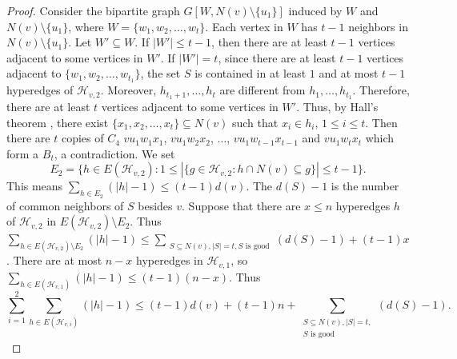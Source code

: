 \documentclass[11pt,a4paper]{article}
\theoremstyle{definition}
\newenvironment{claimproof}
  {\renewcommand{\qedsymbol}{\ensuremath{\blacksquare}}\proof}
  {\endproof}
  {\endproof}
\begin{document}
\begin{proof}
\begin{claimproof}
                Consider the bipartite graph $G[W, N(v) \setminus \{u_1\}]$ induced by $W$ and $N(v) \setminus \{u_1\}$, where $W = \{w_1, w_2, \dots, w_t\}$.
                Each vertex in $W$ has $t - 1$ neighbors in $N(v) \setminus \{u_1\}$.
                Let $W' \subseteq W$.
                If $|W'| \leq t-1$, then there are at least $t-1$ vertices adjacent to some vertices in $W'$.
                If $|W'| = t$, since there are at least $t-1$ vertices adjacent to $\{w_1, w_2, \dots, w_{t_1}\}$, the set $S$ is contained in at least $1$ and at most $t-1$ hyperedges of $\mathcal{H}_{v, 2}$.
                Moreover, $h_{t_1+1}, \dots, h_t$ are different from $h_1, \dots, h_{t_1}$. 
                Therefore, there are at least $t$ vertices adjacent to some vertices in $W'$.
                Thus, by Hall's theorem \cite{HallOn1935}, there exist $\{x_1, x_2, \dots, x_t\} \subseteq N(v)$ such that $x_i \in h_i$, $1 \leq i \leq t$.
                Then there are $t$ copies of $C_4$ $v u_1 w_1 x_1$, $v u_1 w_2 x_2$, $\dots$, $v u_1 w_{t-1} x_{t-1}$ and $v u_1 w_t x_t$ which form a $B_t$, a contradiction.
            \end{claimproof}
            \noindent We set 
            $$E_2 = \{h \in E(\mathcal{H}_{v, 2}): 1 \leq |\{g \in \mathcal{H}_{v, 2}: h \cap N(v) \subseteq g\}| \leq t-1\}.$$
            This means $\sum_{h \in E_2} (|h| - 1) \leq (t-1)d(v).$
            The $d(S) - 1$ is the number of common neighbors of $S$ besides $v$.
            Suppose that there are $x \leq n$ hyperedges $h$ of $\mathcal{H}_{v, 2}$ in $E(\mathcal{H}_{v, 2}) \setminus E_2$.
            Thus $\sum_{h \in E(\mathcal{H}_{v, 2}) \setminus E_2} (|h| - 1)  \leq  \sum_{\substack{S \subseteq N(v), |S| = t, S \text{ is good}}} (d(S) - 1) + (t-1)x$.
            There are at most $n-x$ hyperedges in $\mathcal{H}_{v, 1}$, so $\sum_{h \in E(\mathcal{H}_{v, 1})} (|h| - 1) \leq (t-1)(n - x)$.
            Thus 
            \begin{equation*}
                \sum_{i = 1}^{2} \sum_{h \in E(\mathcal{H}_{v, i})} (|h| - 1) \leq (t-1)d(v) + (t-1)n + \sum_{\substack{S \subseteq N(v), |S| = t, \\ S \text{ is good}}} (d(S) - 1).
            \end{equation*}
            

\end{proof}
\end{document}

